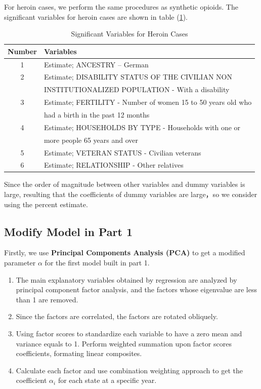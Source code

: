 \documentclass{mcmthesis}
\numberwithin{equation}{section}
\numberwithin{figure}{section}
\numberwithin{table}{section}
\theoremstyle{mydef}
\begin{document}
For heroin cases, we perform the same procedures as synthetic opioids. The significant variables for heroin cases are shown in table (\ref{tab:she}).

\begin{table}[htbp]
  \centering
  \caption{Significant Variables for Heroin Cases}
    \begin{tabular}{cl}
    \addlinespace
    \toprule[1.5pt]
    Number & Variables \\
    \midrule[1pt]
    1     & Estimate; ANCESTRY – German \\
    2     & Estimate; DISABILITY STATUS OF THE CIVILIAN NON\\ & INSTITUTIONALIZED  POPULATION - With a disability \\
    3     & Estimate; FERTILITY - Number of women 15 to 50 years old who\\
    & had a birth in the past 12 months \\
    4     & Estimate; HOUSEHOLDS BY TYPE - Households with one or \\
    &more people 65 years and over \\
    5     & Estimate; VETERAN STATUS - Civilian veterans \\
    6     & Estimate; RELATIONSHIP - Other relatives \\
    \bottomrule[1.5pt]
    \end{tabular}%
  \label{tab:she}%
\end{table}%

Since the order of magnitude between other variables and dummy variables is large, resulting that the coefficients of dummy variables are large，so we consider using the percent estimate.




\subsection{Modify Model in Part 1}

Firstly, we use {\bf{Principal Components Analysis (PCA)}} to get a modified parameter $\alpha$ for the first model built in part 1.

\begin{enumerate}[]
\item
The main explanatory variables obtained by regression are analyzed by principal component factor analysis, and the factors whose eigenvalue are less than 1 are removed.
\item
Since the factors are correlated, the factors are rotated obliquely.
\item
Using factor scores to standardize each variable to have a zero mean and variance equals to 1. Perform weighted summation upon factor scores coefficients, formating linear composites.
\item
Calculate each factor and use combination weighting approach to get the coefficient $\alpha_i$ for each state at a specific year.
\end{enumerate}
\end{document}
